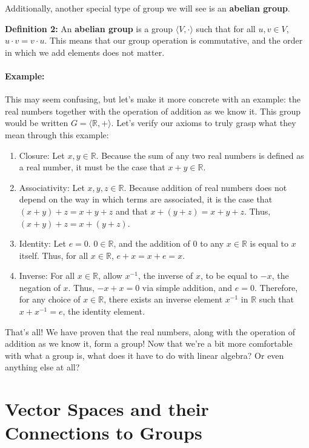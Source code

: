 \documentclass{article}
\newcommand{\R}{\mathbb{R}}
\begin{document}
Additionally, another special type of group we will see is an \textbf{abelian group}.

\textbf{Definition 2:} An \textbf{abelian group} is a group $\langle V, \cdot \rangle$
such that for all $u,v \in V$, $u\cdot v = v\cdot u$. This means that our group operation 
is commutative, and the order in which we add elements does not matter.

\paragraph*{Example:}
This may seem confusing, but let's make it more concrete with an example: 
the real numbers together with the operation of addition as we know it. This 
group would be written $G = \langle \R, +\rangle$. Let's verify our axioms 
to truly grasp what they mean through this example:
\begin{enumerate}
    \item Closure: Let $x,y\in\R$. Because the sum of any two real numbers 
    is defined as a real number, it must be the case that $x+y\in\R$. 
    \item Associativity: Let $x,y,z\in\R$. Because addition of real numbers 
    does not depend on the way in which terms are associated, it is the case 
    that $(x+y)+z = x+y+z$ and that $x+(y+z)=x+y+z$. Thus, $(x+y)+z=x+(y+z)$. 
    \item Identity: Let $e = 0$. $0\in\R$, and the addition of 0 to any $x\in\R$
    is equal to $x$ itself. Thus, for all $x\in\R$, $e+x=x+e=x$. 
    \item Inverse: For all $x\in\R$, allow $x^{-1}$, the inverse of $x$, to be equal 
    to $-x$, the negation of $x$. Thus, $-x+x=0$ via simple addition, and $e=0$.
    Therefore, for any choice of $x\in\R$, there exists an inverse element $x^{-1}$ in $\R$
    such that $x+ x^{-1} =e$, the identity element. 
\end{enumerate}
That's all! We have proven that the real numbers, along with the operation of 
addition as we know it, form a group! Now that we're a bit more comfortable with 
what a group is, what does it have to do with linear algebra? Or even anything 
else at all?

\section{Vector Spaces and their Connections to Groups}
\end{document}
